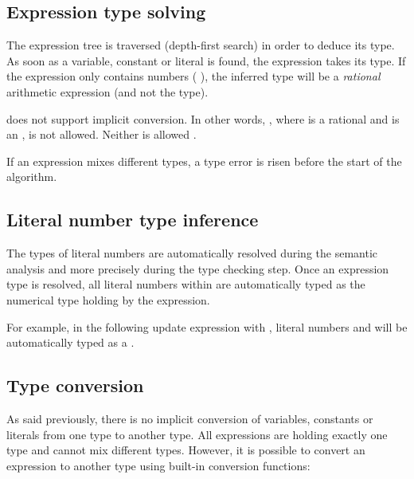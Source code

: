 \subsection{Expression type solving}

The expression tree is traversed (depth-first search) in order to deduce its type.
As soon as a variable, constant or literal is found, the expression takes its type.
If the expression only contains numbers (\eg{} ), the inferred type will be a \emph{rational} arithmetic expression (and not the  type).

\imitator{} does not support implicit conversion.
In other words, , where  is a rational and  is an , is not allowed.
Neither is allowed .

If an expression mixes different types, a type error is risen before the start of the algorithm.


\subsection{Literal number type inference}

The types of literal numbers are automatically resolved during the semantic analysis and more precisely during the type checking step.
Once an expression type is resolved, all literal numbers within are automatically typed as the numerical type holding by the expression. 

For example, in the following update expression  with , literal numbers  and  will be automatically typed as a .

\subsection{Type conversion}

As said previously, there is no implicit conversion of variables, constants or literals from one type to another type. All expressions are holding exactly one type and cannot mix different types. However, it is possible to convert an expression to another type using built-in conversion functions:


